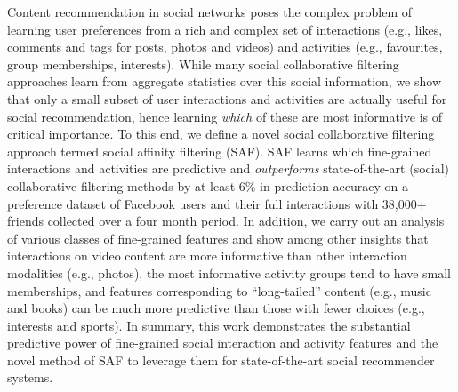 %

Content recommendation in social networks poses the complex problem of
learning user preferences from a rich and complex set of interactions
(e.g., likes, comments and tags for posts, photos and videos) and
activities (e.g., favourites, group memberships, interests).  While
many social collaborative filtering approaches learn from aggregate
statistics over this social information, we show that only a small
subset of user interactions and activities are actually useful for
social recommendation, hence learning \emph{which} of these are most
informative is of critical importance.  To this end, we define a
novel social collaborative filtering approach termed social affinity
filtering (SAF).  SAF learns which fine-grained interactions and
activities are predictive and \emph{outperforms} state-of-the-art
(social) collaborative filtering methods by at least 6\% in prediction
accuracy on a preference dataset of Facebook users and their full
interactions with 38,000+ friends collected over a four month period.
In addition, we carry out an analysis of various classes of
fine-grained features and show among other insights that interactions
on video content are more informative than other interaction
modalities (e.g., photos), the most informative activity groups tend
to have small memberships, and features corresponding to
``long-tailed'' content (e.g., music and books) can be much more
predictive than those with fewer choices (e.g., interests and sports).
In summary, this work demonstrates the substantial predictive power of
fine-grained social interaction and activity features and the novel
method of SAF to leverage them for state-of-the-art social recommender
systems.

